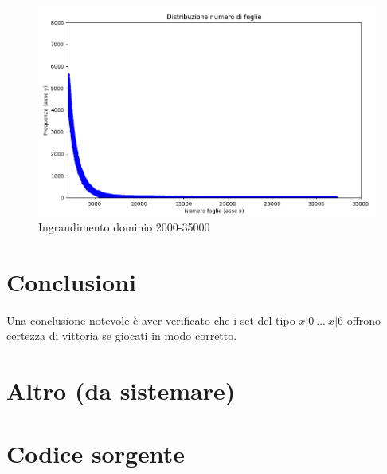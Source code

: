 \documentclass[a4paper,12pt]{report}
\begin{document}
\begin{figure}[h!]
    \centering
    \includegraphics[width=1\textwidth]{imgs/grafico_2000_35000.png} 
    \caption{Ingrandimento dominio 2000-35000}
    \label{fig:etichetta}
\end{figure}


\chapter{Conclusioni}

Una conclusione notevole è aver verificato che i set del tipo \(x|0\ ...\ x|6\) offrono certezza di vittoria se giocati in modo corretto.

\chapter{Altro (da sistemare)}





\appendix
\chapter{Codice sorgente}

\end{document}
